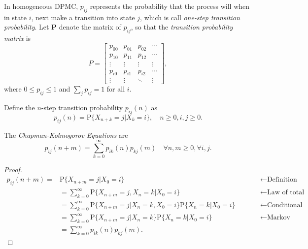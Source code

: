 \documentclass[../Note.tex]{subfiles}
\begin{document}
In homogeneous DPMC, $p_{ij}$ represents the probability that the process will when in state $i$, next make a transition into state $j$, which is call \textit{one-step transition probability}. Let $\mathbf{P}$ denote the matrix of $p_{ij}$, so that the \textit{transition probability matrix} is 
\[
    P=
    \begin{bmatrix}
    p_{00} & p_{01} & p_{02} & \cdots \\
    p_{10} & p_{11} & p_{12} & \cdots \\
    \vdots & \vdots & \vdots & \vdots \\
    p_{i0} & p_{i1} & p_{i2} & \cdots \\
    \vdots & \vdots & \ddots & \vdots
    \end{bmatrix},
\]
where $0 \leq p_{ij} \leq 1$ and $\sum_{j} p_{ij} = 1$ for all $i$.

Define the $n$-step transition probability $p_{ij}(n)$ as 
\[
    p_{ij}(n) = \mathrm{P}\{X_{n+k} = j | X_k = i\}, \quad n \geq 0, i,j \geq 0.
\]

\begin{theorem}
    The \textit{Chapman-Kolmogorov Equations} are 
    \begin{equation}
        p_{ij}(n+m) = \sum\limits_{k=0}^{\infty} p_{ik}{(n)}p_{kj}{(m)} \quad \forall n,m \ge 0, \forall i,j.
    \end{equation} 
\end{theorem}

\begin{proof}
    \[
        \begin{aligned}
            p_{ij}(n+m) = &  \mathrm{P}\{X_{n+m} = j | X_0 = i\} \qquad && \leftarrow \text{Definition} \\
            & = \sum_{k = 0}^{\infty} \mathrm{P}\{X_{n+m} = j, X_n = k | X_0 = i\} \qquad && \leftarrow \text{Law of total probability} \\
            & = \sum_{k = 0}^{\infty} \mathrm{P}\{X_{n+m} = j | X_n = k, X_0 = i\} \mathrm{P}\{X_n = k | X_0 = i\} \qquad && \leftarrow \text{Conditional probability}  \\
            & = \sum_{k = 0}^{\infty} \mathrm{P}\{X_{n+m} = j | X_n = k\} \mathrm{P}\{X_n = k | X_0 = i\} \qquad && \leftarrow \text{Markov property} \\
            & = \sum\limits_{k=0}^{\infty} p_{ik}{(n)}p_{kj}{(m)}.
        \end{aligned}    
    \] 
\end{proof}
\end{document}
